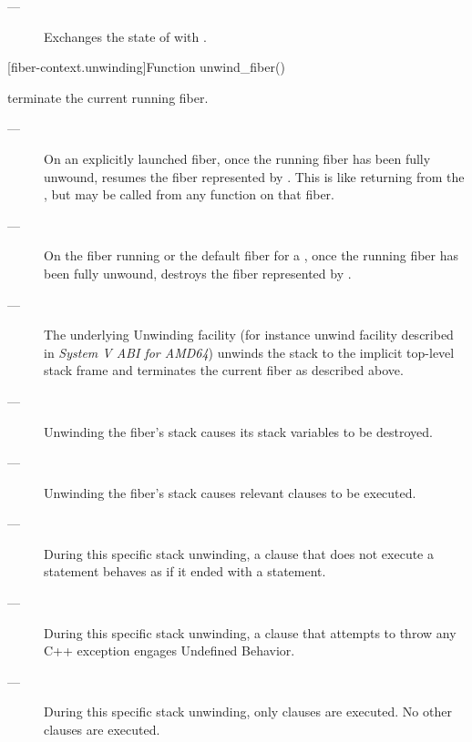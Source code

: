 
\effects
\begin{description}
    \item[---] Exchanges the state of  with .
\end{description}

[fiber-context.unwinding]{Function unwind\_fiber()}


\effects
terminate the current running fiber.

\remarks
\begin{description}
    \item[---] On an explicitly launched fiber, once the running fiber has
               been fully unwound, \unwindfib resumes the fiber represented
               by . This is like returning  from
               the \entryfn, but may be called from any function on that
               fiber.
    \item[---] On the fiber running \main or the default fiber for a \thread,
               once the running fiber has been fully unwound, \unwindfib
               destroys the fiber represented by .
    \item[---] The underlying Unwinding facility (for instance unwind facility
               described in \emph{System V ABI for AMD64}) unwinds the stack
               to the implicit top-level stack frame and terminates the
               current fiber as described above.
    \item[---] Unwinding the fiber's stack causes its stack variables to be
               destroyed.
    \item[---] Unwinding the fiber's stack causes relevant 
               clauses to be executed.
    \item[---] During this specific stack unwinding, a 
               clause that does not execute a  statement behaves
               as if it ended with a  statement.
    \item[---] During this specific stack unwinding, a 
               clause that attempts to throw any C++ exception engages
               Undefined Behavior.
    \item[---] During this specific stack unwinding, only 
               clauses are executed. No other  clauses are
               executed.
\end{description}

